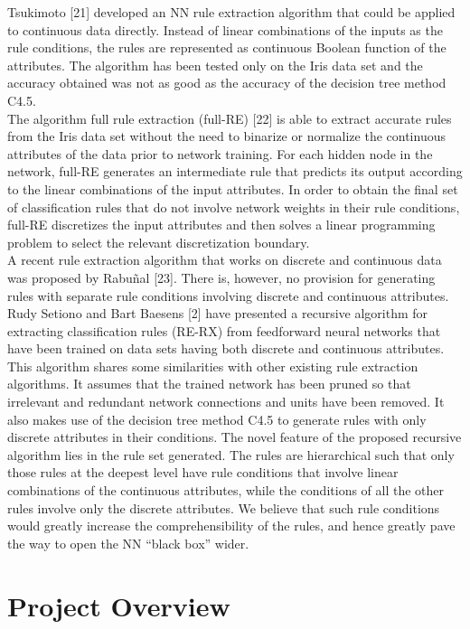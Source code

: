\documentclass[a4paper,14pt,onecolumn]{article}
\begin{document}
    Tsukimoto [21] developed an NN rule extraction algorithm that could be applied to continuous data directly. Instead of linear combinations of the inputs as the rule conditions, the rules are represented as continuous Boolean function of the attributes. The algorithm has been tested only on the Iris data set and the accuracy obtained was not as good as the accuracy of the decision tree method C4.5.\\
    The algorithm full rule extraction (full-RE) [22] is able to extract accurate rules from the Iris data set without the need to binarize or normalize the continuous attributes of the data prior to network training. For each hidden node in the network, full-RE generates an intermediate rule that predicts its output according to the linear combinations of the input attributes. In order to obtain the final set of classification rules that do not involve network weights in their rule conditions, full-RE discretizes the input attributes and then solves a linear programming problem to select the relevant discretization boundary.\\
    A recent rule extraction algorithm that works on discrete and continuous data was proposed by Rabuñal [23]. There is, however, no provision for generating rules with separate rule conditions involving discrete and continuous attributes.\\
     Rudy Setiono and Bart Baesens [2] have presented a recursive algorithm for extracting classification rules (RE-RX) from feedforward neural networks that have been trained on data sets having both discrete and continuous attributes. This algorithm shares some similarities with other existing rule extraction algorithms. It assumes that the trained network has been pruned so that irrelevant and redundant network connections and units have been removed. It also makes use of the decision tree method C4.5 to generate rules with only discrete attributes in their conditions. The novel feature of the proposed recursive algorithm lies in the rule set generated. The rules are hierarchical such that only those rules at the deepest level have rule conditions that involve linear combinations of the continuous attributes, while the conditions of all the other rules involve only the discrete attributes. We believe that such rule conditions would greatly increase the comprehensibility of the rules, and hence greatly pave the way to open the NN “black box” wider.\\

\newpage
\section{Project Overview}
\end{document}
